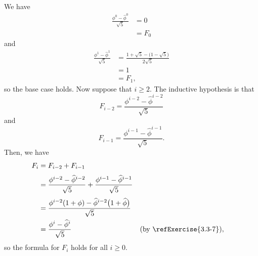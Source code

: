 We have
\begin{align*}
    \frac{\phi^0-\widehat\phi^0}{\sqrt{5}} &= 0 \\
    &= F_0
\end{align*}
and
\begin{align*}
    \frac{\phi^1-\widehat\phi^1}{\sqrt{5}} &= \frac{1+\sqrt{5}-\bigl(1-\sqrt{5}\bigr)}{2\sqrt{5}} \\
    &= 1 \\
    &= F_1,
\end{align*}
so the base case holds.
Now suppose that $i\ge2$.
The inductive hypothesis is that
\[
    F_{i-2} = \frac{\phi^{i-2}-\widehat\phi^{i-2}}{\sqrt{5}}
\]
and
\[
    F_{i-1} = \frac{\phi^{i-1}-\widehat\phi^{i-1}}{\sqrt{5}}.
\]
Then, we have
\begin{align*}
    F_i &= F_{i-2}+F_{i-1} \\[1mm]
    &= \frac{\phi^{i-2}-\widehat\phi^{i-2}}{\sqrt{5}}+\frac{\phi^{i-1}-\widehat\phi^{i-1}}{\sqrt{5}} \\[1mm]
    &= \frac{\phi^{i-2}(1+\phi)-\widehat\phi^{i-2}\bigl(1+\widehat\phi\bigr)}{\sqrt{5}} \\
    &= \frac{\phi^i-\widehat\phi^i}{\sqrt{5}} && \text{(by \refExercise{3.3-7})},
\end{align*}
so the formula for $F_i$ holds for all $i\ge0$.
